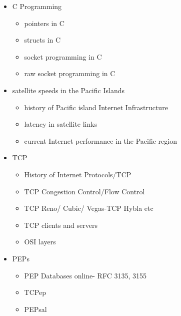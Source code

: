 \begin{itemize}
    \item C Programming
        \begin{itemize}
            \item pointers in C 
            \item structs in C 
            \item socket programming in C
            \item raw socket programming in C
        \end{itemize}
    \item satellite speeds in the Pacific Islands
        \begin{itemize}
            \item history of Pacific island Internet Infrastructure
            \item latency in satellite links
            \item current Internet performance in the Pacific region
        \end{itemize}
    \item TCP
        \begin{itemize}
            \item History of Internet Protocols/TCP
            \item TCP Congestion Control/Flow Control
            \item TCP Reno/ Cubic/ Vegas-TCP Hybla etc
            \item TCP clients and servers
            \item OSI layers
        \end{itemize}
   \item PEPs
         \begin{itemize}
            \item PEP Databases online- RFC 3135, 3155
            \item TCPep
            \item PEPsal
        \end{itemize}
\end{itemize}

